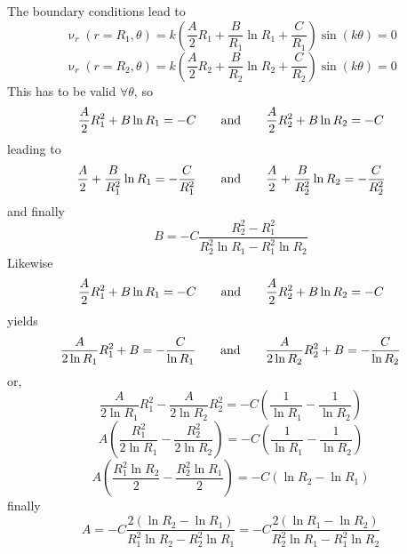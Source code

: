 The boundary conditions lead to
\[
\upnu_r(r=R_1,\theta) = 
k (\frac{A}{2}R_1 + \frac{B}{R_1} \ln R_1 + \frac{C}{R_1}) \sin(k\theta)  = 0
\]
\[
\upnu_r(r=R_2,\theta) = 
k (\frac{A}{2}R_2 + \frac{B}{R_2} \ln R_2 + \frac{C}{R_2}) \sin(k\theta)  = 0
\]
This has to be valid $\forall \theta$, so 
\[
\frac{A}{2}R_1^2 + B \ln R_1 =-C
\quad\quad {\rm and} \quad\quad
\frac{A}{2}R_2^2 + B \ln R_2 =-C
\]
leading to 
\[
\frac{A}{2}+ \frac{B}{R_1^2} \ln R_1 =-\frac{C}{R_1^2}
\quad\quad {\rm and} \quad\quad
\frac{A}{2}+ \frac{B}{R_2^2} \ln R_2 =-\frac{C}{R_2^2}
\]
and finally 
\[
B = -C \frac{R_2^2-R_1^2}{R_2^2 \ln R_1 - R_1^2 \ln R_2}
\]
Likewise
\[
\frac{A}{2}R_1^2 + B \ln R_1 = -C
\quad\quad {\rm and} \quad\quad
\frac{A}{2}R_2^2 + B \ln R_2 = -C
\]
yields
\[
\frac{A}{2 \ln R_1}R_1^2 + B  = -\frac{C}{\ln R_1}
\quad\quad {\rm and} \quad\quad
\frac{A}{2 \ln R_2}R_2^2 + B  = -\frac{C}{\ln R_2}
\]
or, 
\[
\frac{A}{2 \ln R_1}R_1^2 - \frac{A}{2 \ln R_2}R_2^2  =  -C (\frac{1}{\ln R_1} - \frac{1}{\ln R_2})
\]
\[
A (\frac{R_1^2}{2 \ln R_1} - \frac{R_2^2}{2 \ln R_2})  =  -C (\frac{1}{\ln R_1} - \frac{1}{\ln R_2})
\]
\[
A (\frac{R_1^2 \ln R_2 }{2 } - \frac{R_2^2 \ln R_1 }{2} )  = -C( \ln R_2 - \ln R_1)
\]
finally
\[
A = -C\frac{2(\ln R_2 - \ln R_1)} { R_1^2 \ln R_2  - R_2^2 \ln R_1}    
= -C\frac{2(\ln R_1 - \ln R_2)} { R_2^2 \ln R_1  - R_1^2 \ln R_2}    
\]


